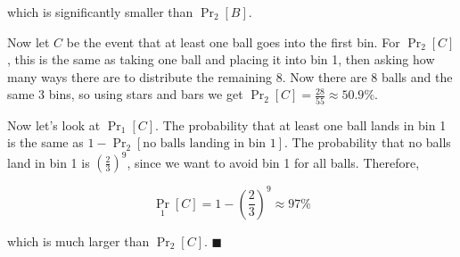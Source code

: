 \documentclass[11pt]{article}
\begin{document}
\begin{enumerate}[(a)]
\begin{solution}
        which is significantly smaller than $\Pr_2[B]$. 

        Now let $C$ be the event that at least one ball goes into the first bin. For $\Pr_2[C]$, this is the same as taking one ball and placing it into bin 1, then asking how many ways there are to distribute the remaining 8. Now there are 8 balls and the same 3 bins, so using stars and bars we get $\Pr_2[C] = \frac{28}{55} \approx 50.9 \%$. 

        Now let's look at $\Pr_1[C]$. The probability that at least one ball lands in bin 1 is the same as $1 - \Pr_2[\text{no balls landing in bin 1}]$. The probability that no balls land in bin 1 is $\left(\frac{2}{3}\right)^9$, since we want to avoid bin 1 for all balls. Therefore, 

        \[ \Pr_1[C] = 1 - \left(\frac{2}{3}\right)^9 \approx 97\%\]

        which is much larger than $\Pr_2[C]$. $\blacksquare$
    \end{solution}
\end{enumerate}
\end{document}
